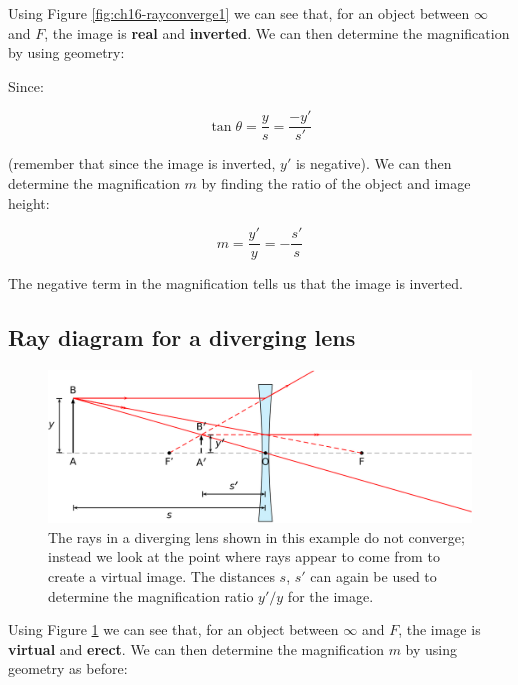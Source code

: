 \documentclass[
]{book}
\begin{document}
Using Figure \ref{fig:ch16-rayconverge1} we can see that, for an object between \(\infty\) and \(F\), the image is \textbf{real} and \textbf{inverted}. We can then determine the magnification by using geometry:

Since:

\begin{equation}
\tan \theta = \frac{y}{s} = \frac{-y'}{s'}
\end{equation}

(remember that since the image is inverted, \(y'\) is negative). We can then determine the magnification \(m\) by finding the ratio of the object and image height:

\begin{equation}
m = \frac{y'}{y} = -\frac{s'}{s}
\end{equation}

The negative term in the magnification tells us that the image is inverted.

\hypertarget{sec:ch16-raydiverge1}{%
\subsection{Ray diagram for a diverging lens}\label{sec:ch16-raydiverge1}}

\begin{figure}

{\centering \includegraphics[width=0.7\linewidth]{visualisations/LaTeX/ch16-diverginglens2a} 

}

\caption{The rays in a diverging lens shown in this example do not converge; instead we look at the point where rays appear to come from to create a virtual image. The distances $s$, $s'$ can again be used to determine the magnification ratio $y'/y$ for the image.}\label{fig:ch16-raydiverge1}
\end{figure}

Using Figure \ref{fig:ch16-raydiverge1} we can see that, for an object between \(\infty\) and \(F\), the image is \textbf{virtual} and \textbf{erect}. We can then determine the magnification \(m\) by using geometry as before:
\end{document}
